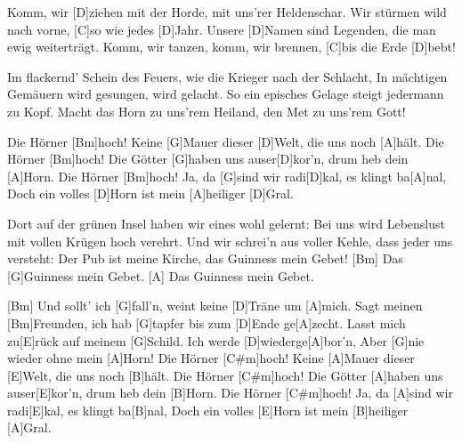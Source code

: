

\begin{guitar}
	Komm, wir [D]ziehen mit der Horde, mit uns'rer Heldenschar.
	Wir stürmen wild nach vorne, [C]so wie jedes [D]Jahr.
	Unsere [D]Namen sind Legenden, die man ewig weiterträgt.
	Komm, wir tanzen, komm, wir brennen, [C]bis die Erde [D]bebt!
	
	Im flackernd' Schein des Feuers, wie die Krieger nach der Schlacht,
	In mächtigen Gemäuern wird gesungen, wird gelacht.
	So ein episches Gelage steigt jedermann zu Kopf.
	Macht das Horn zu uns'rem Heiland, den Met zu uns'rem Gott!
	
	Die Hörner [Bm]hoch! Keine [G]Mauer dieser [D]Welt, die uns noch [A]hält.
	Die Hörner [Bm]hoch! Die Götter [G]haben uns auser[D]kor'n, drum heb dein [A]Horn.
	Die Hörner [Bm]hoch! Ja, da [G]sind wir radi[D]kal, es klingt ba[A]nal,
	Doch ein volles [D]Horn ist mein [A]heiliger [D]Gral.
	
	Dort auf der grünen Insel haben wir eines wohl gelernt:
	Bei uns wird Lebenslust mit vollen Krügen hoch verehrt.
	Und wir schrei'n aus voller Kehle, dass jeder uns versteht:
	Der Pub ist meine Kirche, das Guinness mein Gebet!
	[Bm] Das [G]Guinness mein Gebet.
	[A] Das Guinness mein Gebet.
	
	 
	
	[Bm] Und sollt' ich [G]fall'n, weint keine [D]Träne um [A]mich.
	Sagt meinen [Bm]Freunden, ich hab [G]tapfer bis zum [D]Ende ge[A]zecht.
	Lasst mich zu[E]rück auf meinem [G]Schild. Ich werde [D]wiederge[A]bor'n,
	Aber [G]nie wieder ohne mein [A]Horn!
	\pagebreak
	Die Hörner [C#m]hoch! Keine [A]Mauer dieser [E]Welt, die uns noch [B]hält.
	Die Hörner [C#m]hoch! Die Götter [A]haben uns auser[E]kor'n, drum heb dein [B]Horn.
	Die Hörner [C#m]hoch! Ja, da [A]sind wir radi[E]kal, es klingt ba[B]nal,
	Doch ein volles [E]Horn ist mein [B]heiliger [A]Gral.
\end{guitar}